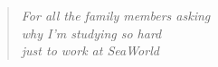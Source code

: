 %
\vspace*{7cm} %
%
\begin{quote}
    \begin{center}
        \textit{For all the family members asking\\why I'm studying so hard\\just to work at SeaWorld}
    \end{center}
\end{quote}
%